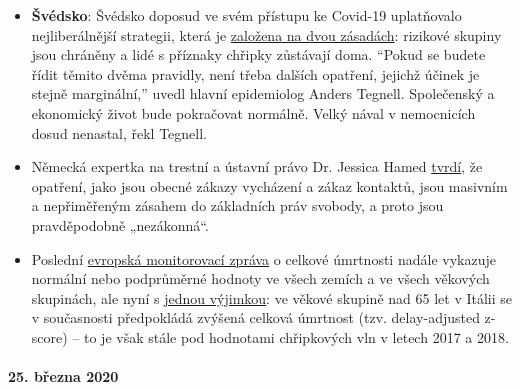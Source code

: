 \begin{itemize}
\tightlist
\item
  \textbf{Švédsko}: Švédsko doposud ve svém přístupu ke Covid-19
  uplatňovalo nejliberálnější strategii, která je
  \href{https://www.zeit.de/politik/ausland/2020-03/coronavirus-schweden-stockholm-oeffentliches-leben/komplettansicht}{založena
  na dvou zásadách}: rizikové skupiny jsou chráněny a lidé s příznaky
  chřipky zůstávají doma. ``Pokud se budete řídit těmito dvěma pravidly,
  není třeba dalších opatření, jejichž účinek je stejně marginální,''
  uvedl hlavní epidemiolog Anders Tegnell. Společenský a ekonomický
  život bude pokračovat normálně. Velký nával v nemocnicích dosud
  nenastal, řekl Tegnell.
\item
  Německá expertka na trestní a ústavní právo Dr. Jessica Hamed
  \href{https://www.fr.de/politik/coronakrise-deutschland-sind-kontaktsperren-ausgangsbeschraenkungen-rechtswidrig-13611821.html}{tvrdí},
  že opatření, jako jsou obecné zákazy vycházení a zákaz kontaktů, jsou
  masivním a nepřiměřeným zásahem do základních práv svobody, a proto
  jsou pravděpodobně „nezákonná``.
\item
  Poslední \href{https://www.euromomo.eu/index.html}{evropská
  monitorovací zpráva} o celkové úmrtnosti nadále vykazuje normální nebo
  podprůměrné hodnoty ve všech zemích a ve všech věkových skupinách, ale
  nyní s
  \href{https://www.euromomo.eu/outputs/zscore_country65.html}{jednou
  výjimkou}: ve věkové skupině nad 65 let v Itálii se v současnosti
  předpokládá zvýšená celková úmrtnost (tzv. delay-adjusted z-score) --
  to je však stále pod hodnotami chřipkových vln v letech 2017 a 2018.
\end{itemize}

\hypertarget{25-bux159ezna-2020}{%
\paragraph{25. března 2020}\label{25-bux159ezna-2020}}

